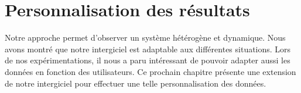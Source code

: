 \part{Personnalisation des résultats}
Notre approche permet d'observer un système hétérogène et dynamique. Nous avons montré que notre intergiciel est adaptable aux différentes situations. Lors de nos expérimentations, il nous a paru intéressant de pouvoir adapter aussi les données en fonction des utilisateurs. Ce prochain chapitre présente une extension de notre intergiciel pour effectuer une telle personnalisation des données.



